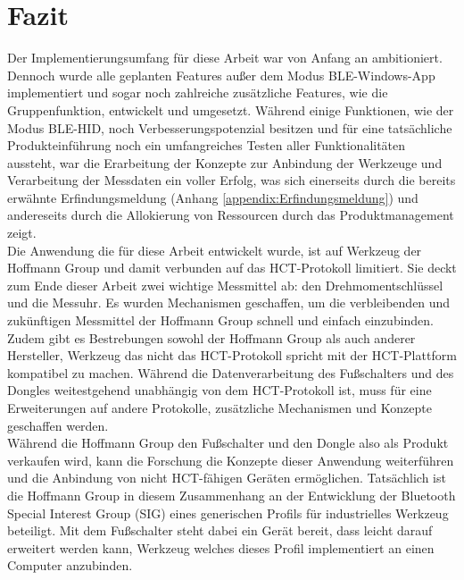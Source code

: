 \section{Fazit}
Der Implementierungsumfang für diese Arbeit war von Anfang an ambitioniert. Dennoch wurde alle geplanten Features außer dem Modus \ac{BLE}-Windows-App implementiert und sogar noch zahlreiche zusätzliche Features, wie die Gruppenfunktion, entwickelt und umgesetzt. Während einige Funktionen, wie der Modus \ac{BLE}-\ac{HID}, noch Verbesserungspotenzial besitzen und für eine tatsächliche Produkteinführung noch ein umfangreiches Testen aller Funktionalitäten aussteht, war die Erarbeitung der Konzepte zur Anbindung der Werkzeuge und Verarbeitung der Messdaten ein voller Erfolg, was sich einerseits durch die bereits erwähnte Erfindungsmeldung (Anhang \ref{appendix:Erfindungsmeldung}) und andereseits durch die Allokierung von Ressourcen durch das Produktmanagement zeigt.\\
Die Anwendung die für diese Arbeit entwickelt wurde, ist auf Werkzeug der Hoffmann Group und damit verbunden auf das \ac{HCT}-Protokoll limitiert. Sie deckt zum Ende dieser Arbeit zwei wichtige Messmittel ab: den Drehmomentschlüssel und die Messuhr. Es wurden Mechanismen geschaffen, um die verbleibenden und zukünftigen Messmittel der Hoffmann Group schnell und einfach einzubinden. Zudem gibt es Bestrebungen sowohl der Hoffmann Group als auch anderer Hersteller, Werkzeug das nicht das \ac{HCT}-Protokoll spricht mit der \ac{HCT}-Plattform kompatibel zu machen. Während die Datenverarbeitung des Fußschalters und des Dongles weitestgehend unabhängig von dem \ac{HCT}-Protokoll ist, muss für eine Erweiterungen auf andere Protokolle, zusätzliche Mechanismen und Konzepte geschaffen werden.\\
Während die Hoffmann Group den Fußschalter und den Dongle also als Produkt verkaufen wird, kann die Forschung die Konzepte dieser Anwendung weiterführen und die Anbindung von nicht \ac{HCT}-fähigen Geräten ermöglichen. Tatsächlich ist die Hoffmann Group in diesem Zusammenhang an der Entwicklung der Bluetooth Special Interest Group (SIG) eines generischen Profils für industrielles Werkzeug beteiligt. Mit dem Fußschalter steht dabei ein Gerät bereit, dass leicht darauf erweitert werden kann, Werkzeug welches dieses Profil implementiert an einen Computer anzubinden.


